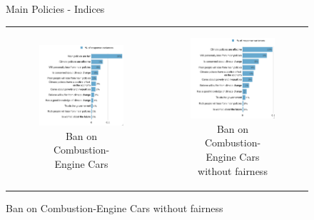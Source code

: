 \documentclass{article}
\begin{document}
\begin{figure}[h!]
\begin{center}
	\caption{Main Policies - Indices}
	\caption*{Variance decomposition LMG}
	\setlength\extrarowheight{-1pt}
	\begin{tabular}{cc}
		\begin{subfigure}{0.5\textwidth}
		\caption{Ban on Combustion-Engine Cars}
			\includegraphics[width=\textwidth]{lmg_standard_indices_non_standardized}
		\end{subfigure}&
		\begin{subfigure}{0.5\textwidth}
		\caption{Ban on Combustion-Engine Cars without fairness}
			\includegraphics[width=\textwidth]{lmg_standard_indices_no_fairness_non_standardized}
		\end{subfigure}\\
	\end{tabular}


\end{center}
\end{figure}
\end{document}
